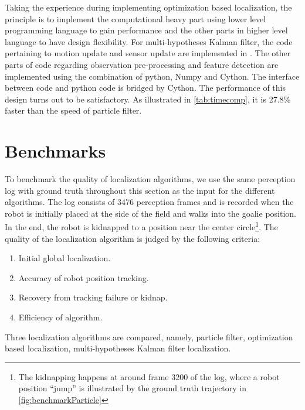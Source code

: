 Taking the experience during implementing optimization based localization, the principle is to implement the computational heavy part using lower level programming language to gain performance and the other parts in higher level language to have design flexibility.
For multi-hypotheses Kalman filter, the code pertaining to motion update and sensor update are implemented in \cpp{}. The other parts of code regarding observation pre-processing and feature detection are implemented using the combination of python, Numpy and Cython. The interface between \cpp{} code and python code is bridged by Cython. The performance of this design turns out to be satisfactory. As illustrated in \autoref{tab:timecomp}, it is 27.8\% faster than the speed of particle filter.

\section{Benchmarks}
\label{sec:Benchmark}
To benchmark the quality of localization algorithms, we use the same perception log with ground truth throughout this section as the input for the different algorithms. The log consists of 3476 perception frames and is recorded when the robot is initially placed at the side of the field and walks into the goalie position. In the end, the robot is kidnapped to a position near the center circle\footnote{The kidnapping happens at around frame 3200 of the log, where a robot position ``jump'' is illustrated by the ground truth trajectory in \autoref{fig:benchmarkParticle}}. The quality of the localization algorithm is judged by the following criteria: 
\begin{enumerate}
  \item Initial global localization.
  \item Accuracy of robot position tracking.
  \item Recovery from tracking failure or kidnap.
  \item Efficiency of algorithm.
\end{enumerate}

Three localization algorithms are compared, namely, particle filter, optimization based localization, multi-hypotheses Kalman filter localization.

